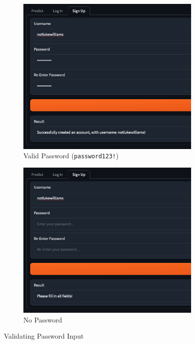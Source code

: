 \documentclass[12pt]{report}
\begin{document}
\begin{figure}[H]
\begin{subfigure}{.45\linewidth}
    \centering
    \includegraphics[width=\linewidth]{ss15.8e.png}
    \caption{Valid Password (\texttt{password123!})}
\end{subfigure}
\begin{subfigure}{.45\linewidth}
    \centering
    \includegraphics[width=\linewidth]{ss15.8f.png}
    \caption{No Password}
\end{subfigure}
\caption{Validating Password Input}\label{fig:signInPasswordInput}
\end{figure}
\end{document}

